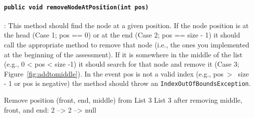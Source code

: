 \paragraph{\lstinline|public void removeNodeAtPosition(int pos)|}: This
method should find the node at a given position. If the node position is at
the head (Case 1; pos == 0) or at the end (Case 2; pos == size - 1) it should
call the appropriate method to remove that node (i.e., the ones you implemented
at the beginning of the assessment). If it is somewhere in the middle of the
list (e.g., 0 < pos < size -1) it should search for that node and remove it
(Case 3; Figure~\ref{fig:addtomiddle}). In the event pos is not a valid index
(e.g., pos\ > \ size - 1 or pos is negative) the method should throw an
\lstinline|IndexOutOfBoundsException|.\\

\begin{shell}
Remove position (front, end, middle) from List 3
List 3 after removing middle, front, and end: 2 --> 2 --> null
\end{shell}

\newpage

%
%
%
